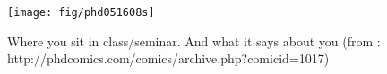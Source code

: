 \documentclass[a4paper]{article}
\begin{document}

  \begin{figure}
  \texttt{[image: fig/phd051608s]}
  \caption{Where you sit in class/seminar. And what it says about you (from : http://phdcomics.com/comics/archive.php?comicid=1017)}
  \end{figure}

  
\end{document}
